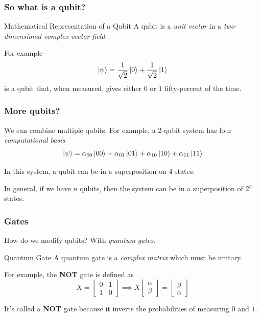 \documentclass{beamer}
\begin{document}
  \begin{frame}
    \frametitle{So what is a qubit?}
    \begin{block}{Mathematical Representation of a Qubit}
      A qubit is a \textit{unit vector} in a \textit{two-dimensional complex vector field}.
    \end{block}

    For example
    \begin{equation*}
      \ket\psi = \frac1{\sqrt 2}\ket0 + \frac1{\sqrt 2}\ket1
    \end{equation*}
    is a qubit that, when measured, gives either $0$ or $1$ fifty-percent of the time.
  \end{frame}
  \begin{frame}
    \frametitle{More qubits?}
    We can combine multiple qubits. For example, a 2-qubit system has four \textit{computational basis}
    \begin{equation*}
      \ket\psi = \alpha_{00}\ket{00} + \alpha_{01}\ket{01} + \alpha_{10}\ket{10} + \alpha_{11}\ket{11}
    \end{equation*}

    In this system, a qubit can be in a superposition on $4$ states.

    In general, if we have $n$ qubits, then the system can be in a superposition of $2^n$ states.
  \end{frame}
  \begin{frame}
    \frametitle{Gates}
    How do we modify qubits? With \textit{quantum gates}.
    \begin{block}{Quantum Gate}
      A quantum gate is a \textit{complex matrix} which must be unitary.
    \end{block}

    For example, the \textbf{NOT} gate is defined as
    \begin{equation*}
      X = \begin{bmatrix}
        0 & 1 \\ 1 & 0
      \end{bmatrix}
      \implies
      X\begin{bmatrix}
        \alpha \\ \beta
      \end{bmatrix}
      = \begin{bmatrix}
        \beta \\ \alpha
      \end{bmatrix}
    \end{equation*}

    It's called a \textbf{NOT} gate because it inverts the probabilities of measuring $0$ and $1$.
  \end{frame}
\end{document}
